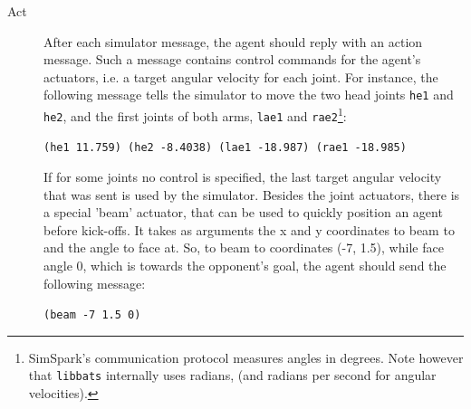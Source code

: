 \begin{description}
	\item[Act] After each simulator message, the agent should reply with an action message. Such a message contains control commands for the agent's actuators, i.e. a target angular velocity for each joint. For instance, the following message tells the simulator to move the two head joints {\tt he1} and {\tt he2}, and the first joints of both arms, {\tt lae1} and {\tt rae2}\footnote{SimSpark's communication protocol measures angles in degrees. Note however that {\tt libbats} internally uses radians, (and radians per second for angular velocities).}:
	
	{\tt (he1 11.759) (he2 -8.4038) (lae1 -18.987) (rae1 -18.985)}
	
	If for some joints no control is specified, the last target angular velocity that was sent is used by the simulator. Besides the joint actuators, there is a special 'beam' actuator, that can be used to quickly position an agent before kick-offs. It takes as arguments the x and y coordinates to beam to and the angle to face at. So, to beam to coordinates (-7, 1.5), while face angle 0, which is towards the opponent's goal, the agent should send the following message:
	
	{\tt (beam -7 1.5 0)}
	
\end{description}


